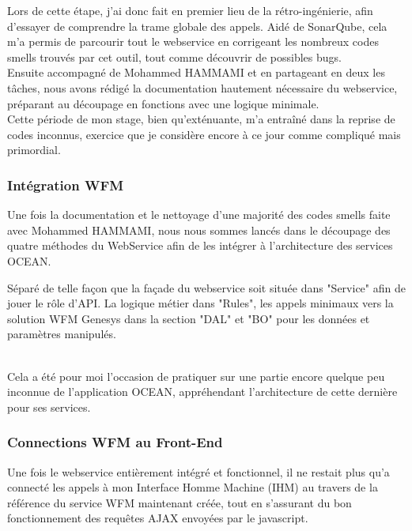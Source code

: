 \documentclass{rapport}
\begin{document}
Lors de cette étape, j'ai donc fait en premier lieu de la rétro-ingénierie, afin d'essayer de comprendre la trame globale des appels. Aidé de SonarQube, cela m'a permis de parcourir tout le webservice en corrigeant les nombreux codes smells trouvés par cet outil, tout comme découvrir de possibles bugs.\\
Ensuite accompagné de Mohammed HAMMAMI et en partageant en deux les tâches, nous avons rédigé la documentation hautement nécessaire du webservice, préparant au découpage en fonctions avec une logique minimale.\\

Cette période de mon stage, bien qu'exténuante, m'a entraîné dans la reprise de codes inconnus, exercice que je considère encore à ce jour comme compliqué mais primordial.

\subsubsection{Intégration WFM}

Une fois la documentation et le nettoyage d'une majorité des codes smells faite avec Mohammed HAMMAMI, nous nous sommes lancés dans le découpage des quatre méthodes du WebService afin de les intégrer à l'architecture des services OCEAN. 

\begin{minipage}{0.35\textwidth}
\end{minipage}
\begin{minipage}{0.55\textwidth}
Séparé de telle façon que la façade du webservice soit située dans "Service" afin de jouer le rôle d'API. La logique métier dans "Rules", les appels minimaux vers la solution WFM Genesys dans la section "DAL" et "BO" pour les données et paramètres manipulés.
\end{minipage}
\vspace{5mm} %
\\

Cela a été pour moi l'occasion de pratiquer sur une partie encore quelque peu inconnue de l'application OCEAN, appréhendant l'architecture de cette dernière pour ses services.

\subsubsection{Connections WFM au Front-End}

Une fois le webservice entièrement intégré et fonctionnel, il ne restait plus qu'a connecté les appels à mon Interface Homme Machine (IHM) au travers de la référence du service WFM maintenant créée, tout en s'assurant du bon fonctionnement des requêtes AJAX envoyées par le javascript.\\
\end{document}
